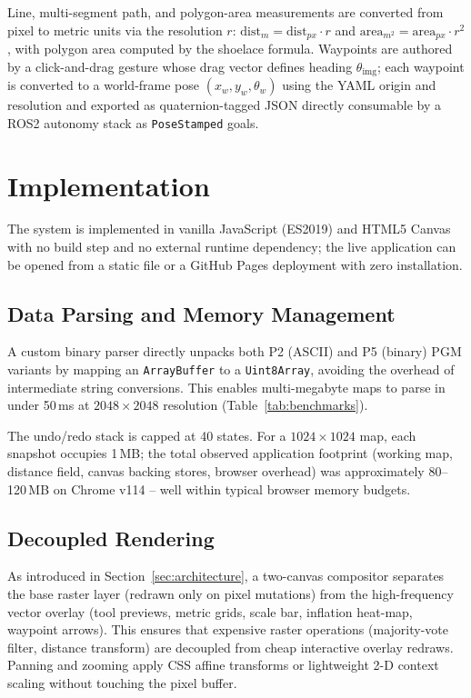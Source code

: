 \documentclass[journal]{IEEEtran}
\begin{document}
Line, multi-segment path, and polygon-area measurements are converted from
pixel to metric units via the resolution $r$:
$\text{dist}_m=\text{dist}_{px}\cdot r$ and
$\text{area}_{m^2}=\text{area}_{px}\cdot r^2$, with polygon area computed by
the shoelace formula.  Waypoints are authored by a click-and-drag gesture
whose drag vector defines heading $\theta_{\text{img}}$; each waypoint is
converted to a world-frame pose $(x_w,y_w,\theta_w)$ using the YAML
origin and resolution and exported as quaternion-tagged JSON directly
consumable by a ROS2 autonomy stack as \texttt{PoseStamped} goals.

\section{Implementation}
\label{sec:implementation}

The system is implemented in vanilla JavaScript (ES2019) and HTML5 Canvas
with no build step and no external runtime dependency; the live application
can be opened from a static file or a GitHub Pages deployment with zero
installation.

\subsection{Data Parsing and Memory Management}

A custom binary parser directly unpacks both P2 (ASCII) and P5 (binary) PGM
variants by mapping an \texttt{ArrayBuffer} to a \texttt{Uint8Array}, avoiding
the overhead of intermediate string conversions.  This enables multi-megabyte
maps to parse in under 50\,ms at $2048\times2048$ resolution
(Table~\ref{tab:benchmarks}).

The undo/redo stack is capped at 40 states.  For a $1024\times1024$ map,
each snapshot occupies 1\,MB; the total observed application footprint
(working map, distance field, canvas backing stores, browser overhead) was
approximately 80--120\,MB on Chrome v114 -- well within typical browser memory
budgets.

\subsection{Decoupled Rendering}

As introduced in Section~\ref{sec:architecture}, a two-canvas compositor
separates the base raster layer (redrawn only on pixel mutations) from the
high-frequency vector overlay (tool previews, metric grids, scale bar,
inflation heat-map, waypoint arrows).  This ensures that expensive raster
operations (majority-vote filter, distance transform) are decoupled from cheap
interactive overlay redraws.  Panning and zooming apply CSS affine transforms
or lightweight 2-D context scaling without touching the pixel buffer.
\end{document}
